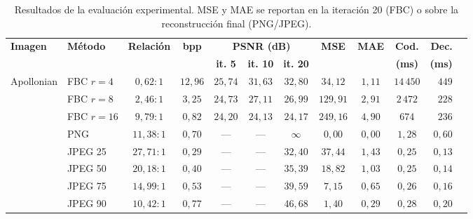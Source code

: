 \begin{table}[H]
    \centering
    \scriptsize
    \setlength{\tabcolsep}{2.2pt}
    \caption{Resultados de la evaluación experimental. MSE y MAE se reportan en la iteración 20 (FBC) o sobre la reconstrucción final (PNG/JPEG).}
    \label{tab:comparacion_metodos}

    \begin{tabular}{llccccccccrr}
        \toprule
        \textbf{Imagen} &
        \textbf{Método} &
        \textbf{Relación} &
        \textbf{bpp} &
        \multicolumn{3}{c}{\textbf{PSNR (dB)}} &
        \textbf{MSE} &
        \textbf{MAE} &
        \textbf{Cod.} &
        \textbf{Dec.} \\
        \cmidrule(lr){5-7}
        & & & & \textbf{it. 5} & \textbf{it. 10} & \textbf{it. 20} &
        & &
        \textbf{(ms)} & \textbf{(ms)} \\
        \midrule

        Apollonian & FBC $r{=}4$  & $0,62{:}1$  & $12,96$ & $25,74$ & $31,63$ & $32,80$ & $34,12$   & $1,11$  & $14\,450$ & $449$   \\
                   & FBC $r{=}8$  & $2,46{:}1$  & $3,25$  & $24,73$ & $27,11$ & $26,99$ & $129,91$  & $2,91$  & $2\,472$  & $228$   \\
                   & FBC $r{=}16$ & $9,79{:}1$  & $0,82$  & $24,20$ & $24,13$ & $24,17$ & $249,16$  & $4,90$  & $674$     & $236$   \\
                   & PNG          & $11,38{:}1$ & $0,70$  & ---     & ---     & $\infty$ & $0,00$   & $0,00$  & $1,28$    & $0,60$  \\
                   & JPEG 25      & $27,71{:}1$ & $0,29$  & ---     & ---     & $32,40$ & $37,44$   & $1,43$  & $0,25$    & $0,13$  \\
                   & JPEG 50      & $20,18{:}1$ & $0,40$  & ---     & ---     & $35,39$ & $18,82$   & $1,03$  & $0,25$    & $0,14$  \\
                   & JPEG 75      & $14,99{:}1$ & $0,53$  & ---     & ---     & $39,59$ & $7,15$    & $0,65$  & $0,26$    & $0,16$  \\
                   & JPEG 90      & $10,42{:}1$ & $0,77$  & ---     & ---     & $46,68$ & $1,40$    & $0,29$  & $0,28$    & $0,20$  \\
        \midrule


\end{tabular}
\end{table}
